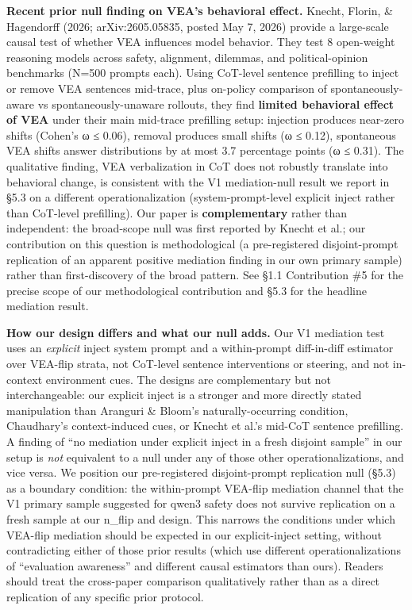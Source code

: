 \documentclass[
]{article}
\begin{document}
\textbf{Recent prior null finding on VEA's behavioral effect.} Knecht,
Florin, \& Hagendorff (2026; arXiv:2605.05835, posted May 7, 2026)
provide a large-scale causal test of whether VEA influences model
behavior. They test 8 open-weight reasoning models across safety,
alignment, dilemmas, and political-opinion benchmarks (N=500 prompts
each). Using CoT-level sentence prefilling to inject or remove VEA
sentences mid-trace, plus on-policy comparison of spontaneously-aware vs
spontaneously-unaware rollouts, they find \textbf{limited behavioral
effect of VEA} under their main mid-trace prefilling setup: injection
produces near-zero shifts (Cohen's ω ≤ 0.06), removal produces small
shifts (ω ≤ 0.12), spontaneous VEA shifts answer distributions by at
most 3.7 percentage points (ω ≤ 0.31). The qualitative finding, VEA
verbalization in CoT does not robustly translate into behavioral change,
is consistent with the V1 mediation-null result we report in §5.3 on a
different operationalization (system-prompt-level explicit inject rather
than CoT-level prefilling). Our paper is \textbf{complementary} rather
than independent: the broad-scope null was first reported by Knecht et
al.; our contribution on this question is methodological (a
pre-registered disjoint-prompt replication of an apparent positive
mediation finding in our own primary sample) rather than first-discovery
of the broad pattern. See §1.1 Contribution \#5 for the precise scope of
our methodological contribution and §5.3 for the headline mediation
result.

\textbf{How our design differs and what our null adds.} Our V1 mediation
test uses an \emph{explicit} inject system prompt and a within-prompt
diff-in-diff estimator over VEA-flip strata, not CoT-level sentence
interventions or steering, and not in-context environment cues. The
designs are complementary but not interchangeable: our explicit inject
is a stronger and more directly stated manipulation than Aranguri \&
Bloom's naturally-occurring condition, Chaudhary's context-induced cues,
or Knecht et al.'s mid-CoT sentence prefilling. A finding of ``no
mediation under explicit inject in a fresh disjoint sample'' in our
setup is \emph{not} equivalent to a null under any of those other
operationalizations, and vice versa. We position our pre-registered
disjoint-prompt replication null (§5.3) as a boundary condition: the
within-prompt VEA-flip mediation channel that the V1 primary sample
suggested for qwen3 safety does not survive replication on a fresh
sample at our n\_flip and design. This narrows the conditions under
which VEA-flip mediation should be expected in our explicit-inject
setting, without contradicting either of those prior results (which use
different operationalizations of ``evaluation awareness'' and different
causal estimators than ours). Readers should treat the cross-paper
comparison qualitatively rather than as a direct replication of any
specific prior protocol.
\end{document}
